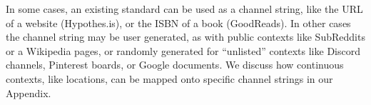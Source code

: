 In some cases, an existing standard can be used as a channel
string, like the URL of a website (Hypothes.is),
or the ISBN of a book (GoodReads).
In other cases the channel string may be user generated,
as with public contexts like SubReddits or a Wikipedia pages,
or randomly generated for ``unlisted'' contexts like
Discord channels, Pinterest boards, or Google documents.
We discuss how continuous contexts, like locations, can be
mapped onto specific channel strings in our Appendix.





